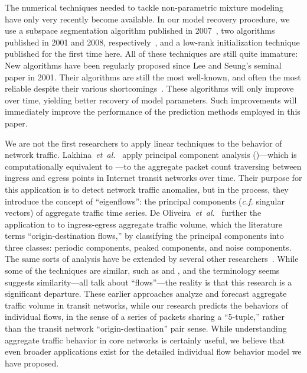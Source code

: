 \documentclass{acm_proc_article-sp}
\begin{document}
The numerical techniques needed to tackle non-parametric mixture modeling have only very recently become available.
In our model recovery procedure, we use a subspace segmentation algorithm published in 2007~\cite{Ma07}, two  algorithms published in 2001 and 2008, respectively~\cite{Lee01,Kim08:anls}, and a low-rank  initialization technique published for the first time here.
All of these techniques are still quite immature:
New  algorithms have been regularly proposed since Lee and Seung's seminal paper in 2001.
Their algorithms are still the most well-known, and often the most reliable despite their various shortcomings~\cite{Langville06}.
These algorithms will only improve over time, yielding better recovery of model parameters.
Such improvements will immediately improve the performance of the prediction methods employed in this paper.

We are not the first researchers to apply linear techniques to the behavior of network traffic.
Lakhina~\emph{et~al.}~\cite{Lakhina04} apply principal component analysis ()---which is computationally equivalent to ---to the aggregate packet count traversing between ingress and egress points in Internet transit networks over time.
Their purpose for this application is to detect network traffic anomalies, but in the process, they introduce the concept of ``eigenflows'':
the principal components (\emph{c.f.} singular vectors) of aggregate traffic time series.
De Oliveira~\emph{et~al.}~\cite{DeOliveira06} further the application to  to ingress-egress aggregate traffic volume, which the literature terms ``origin-destination flows,'' by classifying the principal components into three classes:
periodic components, peaked components, and noise components.
The same sorts of analysis have be extended by several other researchers~\cite{Babiarz06,Juva08}.
While some of the techniques are similar, such as  and , and the terminology seems suggests similarity---all talk about ``flows''---the reality is that this research is a significant departure.
These earlier approaches analyze and forecast aggregate traffic volume in transit networks, while our research predicts the behaviors of individual flows, in the sense of a series of packets sharing a ``5-tuple,'' rather than the transit network ``origin-destination'' pair sense.
While understanding aggregate traffic behavior in core networks is certainly useful, we believe that even broader applications exist for the detailed individual flow behavior model we have proposed.
\end{document}
